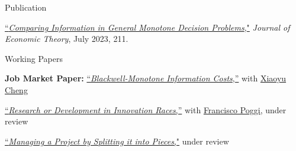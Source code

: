 \begin{rSection}{Publication}
	
	\begin{etaremune}
		\item \href{https://yonggyun-yg-kim.github.io/files/Research%20papers/GMDP_JET.pdf}{``\textit{Comparing Information in General Monotone Decision Problems},"} 
		\textit{Journal of Economic Theory}, July 2023, 211. 
		
	\end{etaremune}
	
	
	
\end{rSection}

\begin{rSection}{Working Papers}
	
	\begin{etaremune}
		
		\item
		\textbf{Job Market Paper:} 
		 \href{https://arxiv.org/pdf/2404.15158.pdf}{``\textit{Blackwell-Monotone Information Costs},''} with \href{https://xiaoyu-cheng.com/}{Xiaoyu Cheng}
		
		\item \href{https://yonggyun-yg-kim.github.io/files/Research%20papers/RDIR.pdf}{``\textit{Research or Development in Innovation Races},''}   with \href{https://www.franciscopoggi.com/}{Francisco Poggi}, under review
		
		\item \href{https://yonggyun-yg-kim.github.io/files/Research%20papers/Managing%20a%20Project%20by%20Splitting%20it%20into%20Pieces.pdf}{``\textit{Managing a Project by Splitting it into Pieces},"} under review

	\end{etaremune}
	
	
\end{rSection}


